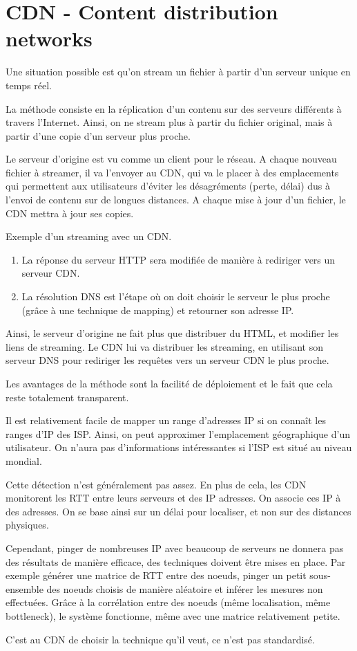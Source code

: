 		\section{CDN - Content distribution networks}
		
		Une situation possible est qu'on stream un fichier à partir d'un serveur unique en temps réel.
			
			
		La méthode consiste en la réplication d'un contenu sur des serveurs différents à travers l'Internet. Ainsi, on ne stream plus à partir du fichier original, mais à partir d'une copie d'un serveur plus proche.
			
		Le serveur d'origine est vu comme un client pour le réseau. A chaque nouveau fichier à streamer, il va l'envoyer au CDN, qui va le placer à des emplacements qui permettent aux utilisateurs d'éviter les désagréments (perte, délai) dus à l'envoi de contenu sur de longues distances. A chaque mise à jour d'un fichier, le CDN mettra à jour ses copies.
			
			Exemple d'un streaming avec un CDN.
			
			
			\begin{enumerate}
				\item La réponse du serveur HTTP sera modifiée de manière à rediriger vers un serveur CDN.
				\item La résolution DNS est l'étape où	on doit choisir le serveur le plus proche (grâce à une technique de mapping) et retourner son adresse IP. 
			\end{enumerate}
			
			Ainsi, le serveur d'origine ne fait plus que distribuer du HTML, et modifier les liens de streaming. Le CDN lui va distribuer les streaming, en utilisant son serveur DNS pour rediriger les requêtes vers un serveur CDN le plus proche.
			
			Les avantages de la méthode sont la facilité de déploiement et le fait que cela reste totalement transparent.
			
			Il est relativement facile de mapper un range d'adresses IP si on connaît les ranges d'IP des ISP. Ainsi, on peut approximer l'emplacement géographique d'un utilisateur. On n'aura pas d'informations intéressantes si l'ISP est situé au niveau mondial.
			
			Cette détection n'est généralement pas assez. En plus de cela, les CDN monitorent les RTT entre leurs serveurs et des IP adresses. On associe ces IP à des adresses. On se base ainsi sur un délai pour localiser, et non sur des distances physiques.
			
			Cependant, pinger de nombreuses IP avec beaucoup de serveurs ne donnera pas des résultats de manière efficace, des techniques doivent être mises en place. Par exemple générer une matrice de RTT entre des noeuds, pinger un petit sous-ensemble des noeuds choisis de manière aléatoire et inférer les mesures non effectuées. Grâce à la corrélation entre des noeuds (même localisation, même bottleneck), le système fonctionne, même avec une matrice relativement petite.
			
			C'est au CDN de choisir la technique qu'il veut, ce n'est pas standardisé.
		